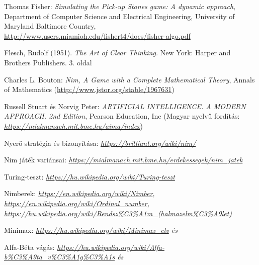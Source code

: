 \begin{thebibliography}{x}

 Thomas Fisher: {\em Simulating the Pick-up Stones game: A dynamic approach}, Department of Computer Science and Electrical Engineering,
University of Maryland Baltimore Country, {\ttfamily \url{ http://www.users.miamioh.edu/fishert4/docs/fisher-algo.pdf}}

Flesch, Rudolf (1951). {\em The Art of Clear Thinking.} New York: Harper and Brothers Publishers. 3. oldal

 Charles L. Bouton: {\em Nim, A Game with a Complete Mathematical Theory}, Annals of Mathematics (\url{http://www.jstor.org/stable/1967631})

Russell Stuart és Norvig Peter: {\em ARTIFICIAL INTELLIGENCE. A MODERN APPROACH. 2nd Edition},  Pearson Education, Inc (Magyar nyelvű fordítás: {\em \url{https://mialmanach.mit.bme.hu/aima/index}})

Nyerő stratégia és bizonyítása: {\em \url{ https://brilliant.org/wiki/nim/}}

Nim játék variánsai: {\em \url{https://mialmanach.mit.bme.hu/erdekessegek/nim_jatek}}

Turing-teszt: {\em \url{https://hu.wikipedia.org/wiki/Turing-teszt}}


Nimberek: {\em \url{https://en.wikipedia.org/wiki/Nimber}, \\
	\url{https://en.wikipedia.org/wiki/Ordinal_number},\\ \url{https://hu.wikipedia.org/wiki/Rendsz\%C3\%A1m_(halmazelm\%C3\%A9let)}}

Minimax: {\em \url{https://hu.wikipedia.org/wiki/Minimax_elv} és \cite{bibref:mi_modern}}

Alfa-Béta vágás: {\em \url{https://hu.wikipedia.org/wiki/Alfa-b\%C3\%A9ta_v\%C3\%A1g\%C3\%A1s} és \cite{bibref:mi_modern}} 

\end{thebibliography}
